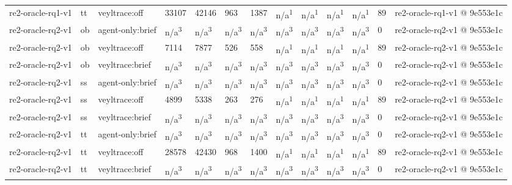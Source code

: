 \begin{table}[t]
\begin{tabular}{lllllllllllll}
re2-oracle-rq1-v1 & tt & veyltrace:off & 33107 & 42146 & 963 & 1387 & n/a\textsuperscript{1} & n/a\textsuperscript{1} & n/a\textsuperscript{1} & n/a\textsuperscript{1} & 89 & re2-oracle-rq1-v1 @ 9e553e1c \\
re2-oracle-rq2-v1 & ob & agent-only:brief & n/a\textsuperscript{3} & n/a\textsuperscript{3} & n/a\textsuperscript{3} & n/a\textsuperscript{3} & n/a\textsuperscript{3} & n/a\textsuperscript{3} & n/a\textsuperscript{3} & n/a\textsuperscript{3} & 0 & re2-oracle-rq2-v1 @ 9e553e1c \\
re2-oracle-rq2-v1 & ob & veyltrace:off & 7114 & 7877 & 526 & 558 & n/a\textsuperscript{1} & n/a\textsuperscript{1} & n/a\textsuperscript{1} & n/a\textsuperscript{1} & 89 & re2-oracle-rq2-v1 @ 9e553e1c \\
re2-oracle-rq2-v1 & ob & veyltrace:brief & n/a\textsuperscript{3} & n/a\textsuperscript{3} & n/a\textsuperscript{3} & n/a\textsuperscript{3} & n/a\textsuperscript{3} & n/a\textsuperscript{3} & n/a\textsuperscript{3} & n/a\textsuperscript{3} & 0 & re2-oracle-rq2-v1 @ 9e553e1c \\
re2-oracle-rq2-v1 & ss & agent-only:brief & n/a\textsuperscript{3} & n/a\textsuperscript{3} & n/a\textsuperscript{3} & n/a\textsuperscript{3} & n/a\textsuperscript{3} & n/a\textsuperscript{3} & n/a\textsuperscript{3} & n/a\textsuperscript{3} & 0 & re2-oracle-rq2-v1 @ 9e553e1c \\
re2-oracle-rq2-v1 & ss & veyltrace:off & 4899 & 5338 & 263 & 276 & n/a\textsuperscript{1} & n/a\textsuperscript{1} & n/a\textsuperscript{1} & n/a\textsuperscript{1} & 89 & re2-oracle-rq2-v1 @ 9e553e1c \\
re2-oracle-rq2-v1 & ss & veyltrace:brief & n/a\textsuperscript{3} & n/a\textsuperscript{3} & n/a\textsuperscript{3} & n/a\textsuperscript{3} & n/a\textsuperscript{3} & n/a\textsuperscript{3} & n/a\textsuperscript{3} & n/a\textsuperscript{3} & 0 & re2-oracle-rq2-v1 @ 9e553e1c \\
re2-oracle-rq2-v1 & tt & agent-only:brief & n/a\textsuperscript{3} & n/a\textsuperscript{3} & n/a\textsuperscript{3} & n/a\textsuperscript{3} & n/a\textsuperscript{3} & n/a\textsuperscript{3} & n/a\textsuperscript{3} & n/a\textsuperscript{3} & 0 & re2-oracle-rq2-v1 @ 9e553e1c \\
re2-oracle-rq2-v1 & tt & veyltrace:off & 28578 & 42430 & 968 & 1400 & n/a\textsuperscript{1} & n/a\textsuperscript{1} & n/a\textsuperscript{1} & n/a\textsuperscript{1} & 89 & re2-oracle-rq2-v1 @ 9e553e1c \\
re2-oracle-rq2-v1 & tt & veyltrace:brief & n/a\textsuperscript{3} & n/a\textsuperscript{3} & n/a\textsuperscript{3} & n/a\textsuperscript{3} & n/a\textsuperscript{3} & n/a\textsuperscript{3} & n/a\textsuperscript{3} & n/a\textsuperscript{3} & 0 & re2-oracle-rq2-v1 @ 9e553e1c \\

\end{tabular}
\end{table}
